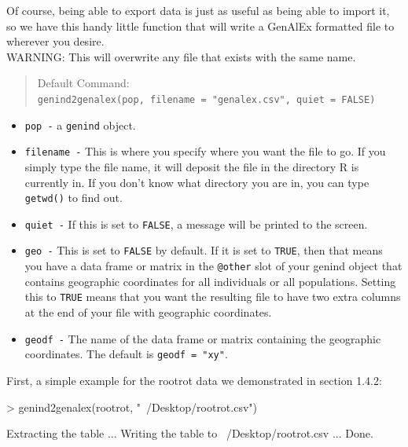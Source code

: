 \documentclass[letterpaper]{article}
\newcommand{\tab}{\hspace*{1em}}
\begin{document}
\tab\tab Of course, being able to export data is just as useful as being able to import it, so we have this handy little function that will write a GenAlEx formatted file to wherever you desire.\\ 
WARNING: This will overwrite any file that exists with the same name.
\begin{quote}
Default Command:\\
\texttt{genind2genalex(pop, filename = "genalex.csv", quiet = FALSE)}
\end{quote}
\begin{itemize}
  \item \texttt{pop -} a \texttt{genind} object.
  \item \texttt{filename -} This is where you specify where you want the file to go. If you simply type the file name, it will deposit the file in the directory R is currently in. If you don't know what directory you are in, you can type \texttt{getwd()} to find out.
  \item \texttt{quiet -} If this is set to \texttt{FALSE}, a message will be printed to the screen.
  \item \texttt{geo -} This is set to \texttt{FALSE} by default. If it is set to \texttt{TRUE}, then that means you have a data frame or matrix in the \texttt{@other} slot of your genind object that contains geographic coordinates for all individuals or all populations. Setting this to \texttt{TRUE} means that you want the resulting file to have two extra columns at the end of your file with geographic coordinates.
  \item \texttt{geodf -} The name of the data frame or matrix containing the geographic coordinates. The default is \texttt{geodf = "xy"}.
\end{itemize}

First, a simple example for the rootrot data we demonstrated in section 1.4.2:
\begin{Schunk}
\begin{Sinput}
> genind2genalex(rootrot, "~/Desktop/rootrot.csv")
\end{Sinput}
\end{Schunk}
\begin{Schunk}
\begin{Soutput}
Extracting the table ... Writing the table to ~/Desktop/rootrot.csv ... Done.
\end{Soutput}
\end{Schunk}
\end{document}
